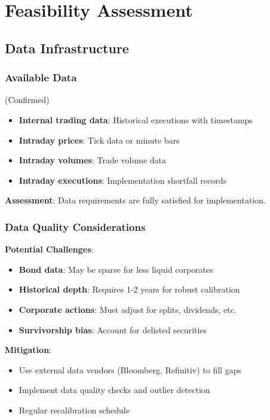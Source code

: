 \documentclass[11pt,a4paper]{article}
\begin{document}
\section{Feasibility Assessment}

\subsection{Data Infrastructure}

\subsubsection{Available Data} (Confirmed)

\begin{itemize}
    \item[\checkmark] \textbf{Internal trading data}: Historical executions with timestamps
    \item[\checkmark] \textbf{Intraday prices}: Tick data or minute bars
    \item[\checkmark] \textbf{Intraday volumes}: Trade volume data
    \item[\checkmark] \textbf{Intraday executions}: Implementation shortfall records
\end{itemize}

\textbf{Assessment}: Data requirements are fully satisfied for implementation.

\subsubsection{Data Quality Considerations}

\textbf{Potential Challenges}:
\begin{itemize}
    \item \textbf{Bond data}: May be sparse for less liquid corporates
    \item \textbf{Historical depth}: Requires 1-2 years for robust calibration
    \item \textbf{Corporate actions}: Must adjust for splits, dividends, etc.
    \item \textbf{Survivorship bias}: Account for delisted securities
\end{itemize}

\textbf{Mitigation}:
\begin{itemize}
    \item Use external data vendors (Bloomberg, Refinitiv) to fill gaps
    \item Implement data quality checks and outlier detection
    \item Regular recalibration schedule
\end{itemize}
\end{document}
